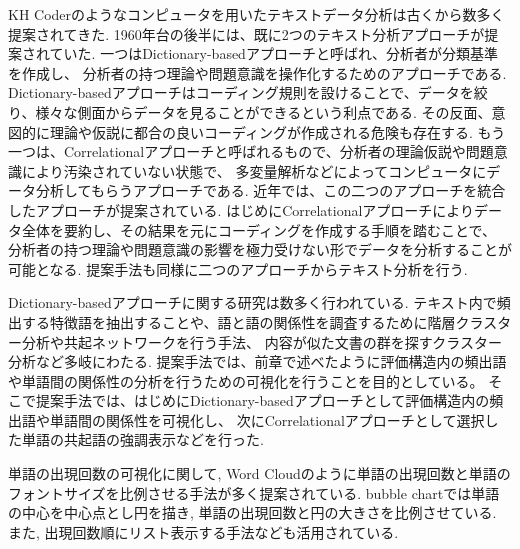\documentclass[syuuron]{kuee}
\begin{document}
		KH Coderのようなコンピュータを用いたテキストデータ分析は古くから数多く提案されてきた. 
		1960年台の後半には、既に2つのテキスト分析アプローチが提案されていた. 
		一つはDictionary-basedアプローチと呼ばれ、分析者が分類基準を作成し、
		分析者の持つ理論や問題意識を操作化するためのアプローチである. 
		Dictionary-basedアプローチはコーディング規則を設けることで、データを絞り、様々な側面からデータを見ることができるという利点である. 
		その反面、意図的に理論や仮説に都合の良いコーディングが作成される危険も存在する. 
		もう一つは、Correlationalアプローチと呼ばれるもので、分析者の理論仮説や問題意識により汚染されていない状態で、
		多変量解析などによってコンピュータにデータ分析してもらうアプローチである. 
		近年では、この二つのアプローチを統合したアプローチが提案されている\cite{kh1}. 
		はじめにCorrelationalアプローチによりデータ全体を要約し、その結果を元にコーディングを作成する手順を踏むことで、
		分析者の持つ理論や問題意識の影響を極力受けない形でデータを分析することが可能となる. 
		提案手法も同様に二つのアプローチからテキスト分析を行う. 
		
		Dictionary-basedアプローチに関する研究は数多く行われている. 
		テキスト内で頻出する特徴語を抽出することや、語と語の関係性を調査するために階層クラスター分析や共起ネットワークを行う手法、
		内容が似た文書の群を探すクラスター分析など多岐にわたる. 
		提案手法では、前章で述べたように評価構造内の頻出語や単語間の関係性の分析を行うための可視化を行うことを目的としている。
		そこで提案手法では、はじめにDictionary-basedアプローチとして評価構造内の頻出語や単語間の関係性を可視化し、
		次にCorrelationalアプローチとして選択した単語の共起語の強調表示などを行った. 
		
		単語の出現回数の可視化に関して, Word Cloudのように単語の出現回数と単語のフォントサイズを比例させる手法が多く提案されている\cite{wc1}. 
		bubble chartでは単語の中心を中心点とし円を描き, 単語の出現回数と円の大きさを比例させている. 
		また, 出現回数順にリスト表示する手法なども活用されている. 
		
\end{document}
